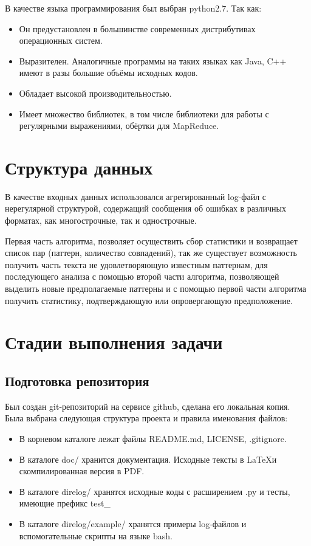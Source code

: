 В качестве языка программирования был выбран python2.7. Так как:

\begin{itemize}
\item Он предустановлен в большинстве современных дистрибутивах
  операционных систем.
\item Выразителен. Аналогичные программы на таких языках как Java, C++
  имеют в разы большие объёмы исходных кодов.
\item Обладает высокой производительностью.
\item Имеет множество библиотек, в том числе библиотеки для работы с
  регулярными выражениями, обёртки для MapReduce.

\end{itemize}

\section{Структура данных}
В качестве входных данных использовался агрегированный log-файл с нерегулярной
структурой, содержащий сообщения об ошибках в различных форматах, как
многострочные, так и однострочные.

Первая часть алгоритма, позволяет осуществить сбор статистики
и возвращает список пар (паттерн, количество совпадений), так же существует
возможность получить часть текста не удовлетворяющую известным паттернам,
для последующего анализа с помощью второй части алгоритма, позволяющей
выделить новые предполагаемые паттерны и с помощью первой части алгоритма
получить статистику, подтверждающую или опровергающую предположение.

\section{Стадии выполнения задачи}
\subsection{Подготовка репозитория}
Был создан git-репозиторий на сервисе github, сделана его локальная копия.
Была выбрана следующая структура проекта и правила именования файлов:

\begin{itemize}
\item В корневом каталоге лежат файлы README.md, LICENSE, .gitignore.
\item В каталоге doc/ хранится документация. Исходные тексты в \LaTeX и
  скомпилированная версия в PDF.
\item В каталоге direlog/ хранятся исходные коды с расширением .py и тесты,
  имеющие префикс test\_
\item В каталоге direlog/example/ хранятся примеры log-файлов и
  вспомогательные скрипты на языке bash.
\end{itemize}

